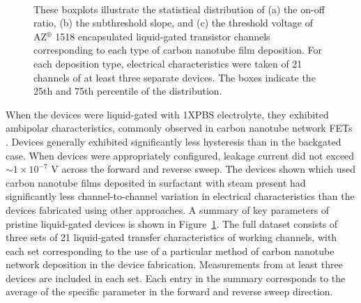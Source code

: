 \documentclass[
  a4paper,
]{scrbook}
\begin{document}
\begin{figure}
\begin{minipage}[t]{0.47\linewidth}
{{}

}

\subcaption{\label{fig-threshold-voltage}}
\end{minipage}%
%
\begin{minipage}[t]{0.26\linewidth}

{\centering 

~

}

\end{minipage}%

\caption{\label{fig-sweep-parameters}These boxplots illustrate the
statistical distribution of (a) the on-off ratio, (b) the subthreshold
slope, and (c) the threshold voltage of AZ\(^\circledR\) 1518
encapsulated liquid-gated transistor channels corresponding to each type
of carbon nanotube film deposition. For each deposition type, electrical
characteristics were taken of 21 channels of at least three separate
devices. The boxes indicate the 25th and 75th percentile of the
distribution.}

\end{figure}

When the devices were liquid-gated with 1XPBS electrolyte, they
exhibited ambipolar characteristics, commonly observed in carbon
nanotube network FETs
\autocite{Kauffman2008,Heller2009,JongYu2009,Derenskyi2014,Thanihaichelvan2018,Albarghouthi2022}.
Devices generally exhibited significantly less hysteresis than in the
backgated case. When devices were appropriately configured, leakage
current did not exceed \(\sim 1 \times 10^{-7}\) V across the forward
and reverse sweep. The devices shown which used carbon nanotube films
deposited in surfactant with steam present had significantly less
channel-to-channel variation in electrical characteristics than the
devices fabricated using other approaches. A summary of key parameters
of pristine liquid-gated devices is shown in
Figure~\ref{fig-sweep-parameters}. The full dataset consists of three
sets of 21 liquid-gated transfer characteristics of working channels,
with each set corresponding to the use of a particular method of carbon
nanotube network deposition in the device fabrication. Measurements from
at least three devices are included in each set. Each entry in the
summary corresponds to the average of the specific parameter in the
forward and reverse sweep direction.
\end{document}
